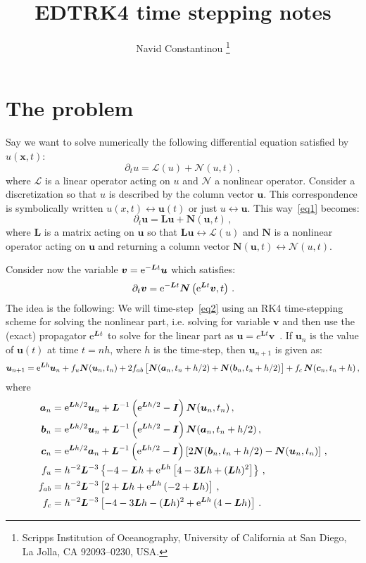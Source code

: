 \documentclass[11pt]{article}
\def\beq{\begin{equation}}
\def\eeq{\end{equation}}
\newcommand{\bx}{\boldsymbol{x}}
\newcommand{\bu}{\boldsymbol{u}}
\newcommand{\ba}{\boldsymbol{a}}
\newcommand{\bb}{\boldsymbol{b}}
\newcommand{\bc}{\boldsymbol{c}}
\newcommand{\bv}{\boldsymbol{v}}
\newcommand{\bk}{\boldsymbol{k}}
\newcommand{\bL}{\ensuremath {\boldsymbol {L}}}
\newcommand{\bI}{\ensuremath {\boldsymbol {I}}}
\newcommand{\bN}{\ensuremath {\boldsymbol {N}}}
\providecommand\bcdot{\boldsymbol{\cdot}}
\def\ii{{\rm i}}
\def\ee{{\rm e}}
\newcommand{\N}{\mathscr{N}}
\newcommand{\com}{\, ,}
\newcommand{\per}{\, .}
\renewcommand{\(}{\left(}
\renewcommand{\[}{\left[}
\renewcommand{\)}{\right)}
\renewcommand{\]}{\right]}
\newcommand{\<}{\left\langle}
\renewcommand{\>}{\right\rangle}
\renewcommand{\L}{\mathcal{L}}
\renewcommand{\N}{\mathcal{N}}
\begin{document}
\title{EDTRK4 time stepping notes}

\author{
Navid Constantinou \thanks {Scripps Institution of Oceanography,
University of California at San Diego, La Jolla, CA
92093--0230, USA.
}
}


\maketitle

\section{The problem}

Say we want to solve numerically the following differential equation satisfied by $u(\bx,t)$:
\beq
\partial_t u  = \L(u)  + \N\(u,t\)\com\label{eq1}
\eeq
where $\L$ is a linear operator acting on $u$ and $\N$ a nonlinear operator. Consider a discretization so that $u$ is described by the column vector $\bu$. This correspondence is symbolically written $u(x,t)\leftrightarrow\bu(t)$ or just $u\leftrightarrow\bu$. This way~\eqref{eq1} becomes:
\beq
\partial_t \bu  = \bL \bu  + \bN \( \bu,t\)\com\label{eq2}
\eeq
where $\bL$ is a matrix acting on $\bu$ so that $\bL \bu\leftrightarrow \L(u)$ and $\bN$ is a nonlinear operator acting on $\bu$ and returning a column vector $\bN \( \bu,t\)\leftrightarrow \N(u,t)$.

Consider now the variable ${\bv} = \ee^{-\bL t}{\bu}$ which satisfies:
\beq
\partial_t{\bv} =  \ee^{-\bL t}\bN\(\ee^{\bL t}{\bv},t\)\per
\eeq
The idea is the following: We will time-step~\eqref{eq2} using an RK4 time-stepping scheme for solving the nonlinear part, i.e. solving for variable ${\bv}$ and then use the (exact) propagator $\ee^{\bL t}$ to solve for the linear part as ${\bu}=e^{\bL t}{\bv}$~\citep{Cox-Matthews-2002}. If ${\bu}_n$ is the value of $\bu(t)$ at time $t=n h$, where $h$ is the time-step, then ${\bu}_{n+1}$ is given as:
\begin{align}
{\bu}_{n+1} = \ee^{\bL h} {\bu}_n + f_u \bN({\bu}_n,t_n) + 2f_{ab}\[\bN({\ba}_n,t_n+h/2)+\bN({\bb}_n,t_n+h/2)\vphantom{\dot W} \] + f_c\, \bN({\bc}_n,t_n+h)\com\label{eq:u_n+1}
\end{align}
where\begin{subequations}
\begin{align}
\ba_n &= \ee^{\bL h/2} \bu_n + \bL^{-1}\(\ee^{\bL h/2} -\bI \) \bN(\bu_n,t_n) \com\\
\bb_n &= \ee^{\bL h/2} \bu_n + \bL^{-1}\(\ee^{\bL h/2} -\bI \) \bN(\ba_n,t_n+h/2) \com\\
\bc_n &= \ee^{\bL h/2} \ba_n + \bL^{-1}\(\ee^{\bL h/2} -\bI \) \[ 2\bN(\bb_n,t_n+h/2) -\bN(\bu_n,t_n)\]\com\\
f_u&= h^{-2}\bL^{-3}\left\{-4-\bL h+\ee^{\bL h}\[4-3\bL h+(\bL h)^2 \]\right\}\com\\
f_{ab}&= h^{-2}\bL^{-3}\[2+\bL h+\ee^{\bL h}\(-2+\bL h\)\]\com\\
f_c &= h^{-2}\bL^{-3}\[-4-3\bL h -(\bL h)^2+\ee^{\bL h}\(4-\bL h\)\]\per
\end{align}\label{eq:EDTRK4coeffs}\end{subequations}
\end{document}
